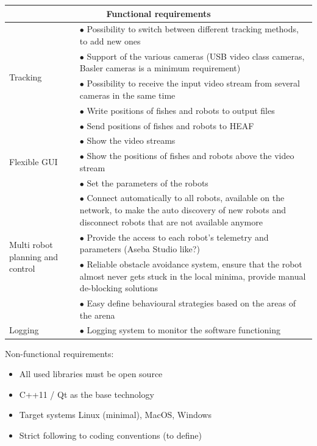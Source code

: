 \documentclass{styles/assisi}
\begin{document}
\begin{table}[h]
\begin{tabular}{|p{}|p{}|}
  \hline
  \multicolumn{2}{|c|}{Functional requirements} \\
  \hline
  \multirow{5}{*}{Tracking} & $\bullet$ Possibility to switch between different tracking methods, to add new ones \\
  & $\bullet$ Support of the various cameras (USB video class cameras, Basler cameras is a minimum requirement) \\
  & $\bullet$ Possibility to receive the input video stream from several cameras in the same time \\
& $\bullet$ Write positions of fishes and robots to output files \\
&  $\bullet$ Send positions of fishes and robots to HEAF \\
\hline
  \multirow{3}{*}{Flexible GUI} & $\bullet$ Show the video streams \\
  & $\bullet$ Show the positions of fishes and robots above the video stream \\
  & $\bullet$ Set the parameters of the robots \\
\hline
  \multirow{4}{*}{\parbox{0.25\textwidth}{Multi robot planning and control}} & $\bullet$ Connect automatically to all robots, available on the network, to make the auto discovery of new robots and disconnect robots that are not available anymore \\
  & $\bullet$ Provide the access to each robot's telemetry and parameters (Aseba Studio like?) \\
  & $\bullet$ Reliable obstacle avoidance system, ensure that the robot almost never gets stuck in the local minima, provide manual de-blocking  solutions \\
  & $\bullet$ Easy define behavioural strategies based on the areas of the arena \\
\hline
Logging & $\bullet$ Logging system to monitor the software functioning \\
\hline
\end{tabular}
\end{table}

Non-functional requirements:
\begin{itemize}
\item All used libraries must be open source
\item  C++11 / Qt as the base technology
\item  Target systems Linux (minimal), MacOS, Windows
\item  Strict following to coding conventions (to define)
\end{itemize}
\end{document}
